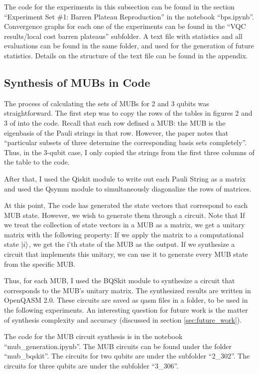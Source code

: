 \documentclass[a4paper,12pt]{article}
\begin{document}
The code for the experiments in this subsection can be found in the section ``Experiment Set \#1: Barren Plateau Reproduction'' in the notebook ``bps.ipynb''.
Convergence graphs for each one of the experiments can be found in the ``VQC results/local cost barren plateaus'' subfolder. A text file with statistics and all evaluations can be found in the same folder, and used for the generation of future statistics. Details on the structure of the text file can be found in the appendix.

\subsection{Synthesis of MUBs in Code} \label{subsec:mub_synthesis}
The process of calculating the sets of MUBs for 2 and 3 qubits was straightforward.
The first step was to copy the rows of the tables in figures 2 and 3 of \cite{lawrence_mutually_2002} into the code.
Recall that each row defined a MUB: the MUB is the eigenbasis of the Pauli strings in that row.
However, the paper notes that ``particular subsets of three determine the corresponding basis sets completely''.
Thus, in the 3-qubit case, I only copied the strings from the first three columns of the table to the code.

After that, I used the Qiskit module to write out each Pauli String as a matrix and used the Qsymm module to simultaneously diagonalize the rows of matrices.

At this point, The code has generated the state vectors that correspond to each MUB state. However, we wish to generate them through a circuit.
Note that If we treat the collection of state vectors in a MUB as a matrix, we get a unitary matrix with the following property:
If we apply the matrix to a computational state $\ket{i}$, we get the i'th state of the MUB as the output.
If we synthesize a circuit that implements this unitary, we can use it to generate every MUB state from the specific MUB.

Thus, for each MUB, I used the BQSkit module to synthesize a circuit that corresponds to the MUB's unitary matrix.
The synthesized results are written in OpenQASM 2.0.
These circuits are saved as qasm files in a folder, to be used in the following experiments.
An interesting question for future work is the matter of synthesis complexity and accuracy (discussed in section \ref{sec:future_work}).

The code for the MUB circuit synthesis is in the notebook ``mub\_generation.ipynb''.
The MUB circuits can be found under the folder ``mub\_bqskit''.
The circuits for two qubits are under the subfolder ``2\_302''. The circuits for three qubits are under the subfolder ``3\_306''.
\end{document}
